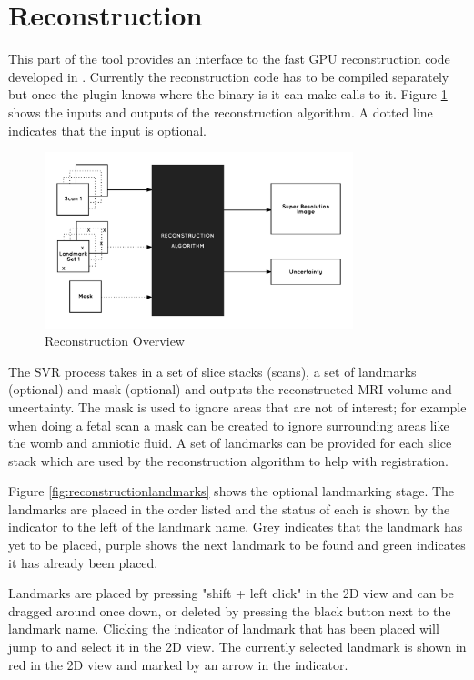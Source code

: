\clearpage
\section{Reconstruction}\label{implementation:reconstruction}
This part of the tool provides an interface to the fast GPU reconstruction code developed in \cite{uncertaintysvd}. Currently the reconstruction code has to be compiled separately but once the plugin knows where the binary is it can make calls to it. Figure \ref{fig:reconstruction_overview} shows the inputs and outputs of the reconstruction algorithm. A dotted line indicates that the input is optional.

\begin{figure}[h]
  \centering
  \includegraphics[width=0.8\textwidth]{images/reconstruction_overview.png}
  \caption{Reconstruction Overview}
  \label{fig:reconstruction_overview}
\end{figure}

The SVR process takes in a set of slice stacks (scans), a set of landmarks (optional) and mask (optional) and outputs the reconstructed MRI volume and uncertainty. The mask is used to ignore areas that are not of interest; for example when doing a fetal scan a mask can be created to ignore surrounding areas like the womb and amniotic fluid. A set of landmarks can be provided for each slice stack which are used by the reconstruction algorithm to help with registration.

Figure \ref{fig:reconstructionlandmarks} shows the optional landmarking stage. The landmarks are placed in the order listed and the status of each is shown by the indicator to the left of the landmark name. Grey indicates that the landmark has yet to be placed, purple shows the next landmark to be found and green indicates it has already been placed. 

Landmarks are placed by pressing "shift + left click" in the 2D view and can be dragged around once down, or deleted by pressing the black button next to the landmark name. Clicking the indicator of landmark that has been placed will jump to and select it in the 2D view. The currently selected landmark is shown in red in the 2D view and marked by an arrow in the indicator.

